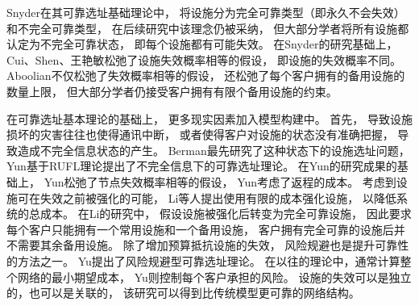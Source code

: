 Snyder\cite{Snyder2005}在其可靠选址基础理论中，
将设施分为完全可靠类型（即永久不会失效）和不完全可靠类型，
在后续研究中该理念仍被采纳\cite{rpmp,lim,李汉卿}，
但大部分学者将所有设施都认定为不完全可靠状态，
即每个设施都有可能失效。
在Snyder\cite{Snyder2005}的研究基础上，
Cui\cite{Cui2010}、Shen\cite{Shen2011}、王艳敏\cite{王艳敏}松弛了设施失效概率相等的假设，
即设施的失效概率不同。
Aboolian\cite{Aboolian}不仅松弛了失效概率相等的假设，
还松弛了每个客户拥有的备用设施的数量上限，
但大部分学者仍接受客户拥有有限个备用设施的约束。

在可靠选址基本理论的基础上，
更多现实因素加入模型构建中。
首先，
导致设施损坏的灾害往往也使得通讯中断，
或者使得客户对设施的状态没有准确把握，
导致造成不完全信息状态的产生。
Berman\cite{BermanIncompleteInformation}最先研究了这种状态下的设施选址问题，
{Yun\cite{yun2015}基于RUFL理论提出了不完全信息下的可靠选址理论。
在Yun\cite{yun2015}的研究成果的基础上，
Yun\cite{yun2017}松弛了节点失效概率相等的假设，
Yun\cite{YUN2020}考虑了返程的成本。} 
考虑到设施可在失效之前被强化的可能，
Li等人\cite{qingwei,qingwei2,qingwei3}提出使用有限的成本强化设施，
以降低系统的总成本。
在Li\cite{qingwei2,qingwei}的研究中，
假设设施被强化后转变为完全可靠设施，
因此要求每个客户只能拥有一个常用设施和一个备用设施，
客户拥有完全可靠的设施后并不需要其余备用设施。
除了增加预算抵抗设施的失效，
风险规避也是提升可靠性的方法之一。
Yu\cite{risk_averse1,risk_averse2}提出了风险规避型可靠选址理论。
在以往的理论中，通常计算整个网络的最小期望成本，
Yu\cite{risk_averse1,risk_averse2}则控制每个客户承担的风险。
设施的失效可以是独立的，也可以是关联的，
该研究可以得到比传统模型更可靠的网络结构。

